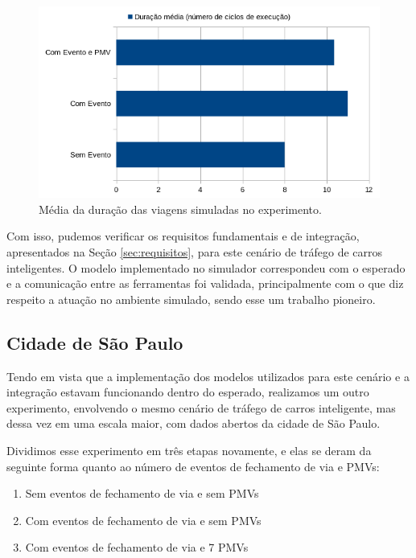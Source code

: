 \begin{figure}[ht]
	\centering
	\includegraphics[width=\textwidth]{figuras/duracao_validacao.png}
	\caption{Média da duração das viagens simuladas no experimento.}
	\label{fig:duracao_validacao}
\end{figure}

Com isso, pudemos verificar os requisitos fundamentais e de integração, apresentados na Seção \ref{sec:requisitos}, para este cenário de tráfego de carros inteligentes.
O modelo implementado no simulador correspondeu com o esperado e a comunicação entre as ferramentas foi validada, principalmente com o que diz respeito a atuação no ambiente simulado, sendo esse um
trabalho pioneiro.

\subsection{Cidade de São Paulo}
\label{sec:smart_traffic}

Tendo em vista que a implementação dos modelos utilizados para este cenário e a integração estavam funcionando dentro do esperado, realizamos um outro experimento, envolvendo o mesmo cenário de tráfego de
carros inteligente, mas dessa vez em uma escala maior, com dados abertos da cidade de São Paulo.

Dividimos esse experimento em três etapas novamente, e elas se deram da seguinte forma quanto ao número de eventos de fechamento de via e PMVs:

\begin{enumerate}
    \item Sem eventos de fechamento de via e sem PMVs

    \item Com eventos de fechamento de via e sem PMVs

    \item Com eventos de fechamento de via e 7 PMVs
\end{enumerate}

